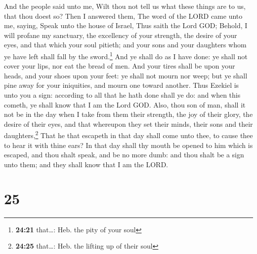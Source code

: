  And the people said unto me, Wilt thou not tell us what
these things are to us, that thou doest so?  Then I
answered them, The word of the LORD came unto me, saying,
 Speak unto the house of Israel, Thus saith the Lord GOD;
Behold, I will profane my sanctuary, the excellency of your strength,
the desire of your eyes, and that which your soul pitieth; and your sons
and your daughters whom ye have left shall fall by the sword.\footnote{\textbf{24:21}
  that\ldots: Heb. the pity of your soul}  And ye shall
do as I have done: ye shall not cover your lips, nor eat the bread of
men.  And your tires shall be upon your heads, and your
shoes upon your feet: ye shall not mourn nor weep; but ye shall pine
away for your iniquities, and mourn one toward another. 
Thus Ezekiel is unto you a sign: according to all that he hath done
shall ye do: and when this cometh, ye shall know that I am the Lord GOD.
 Also, thou son of man, shall it not be in the day when I
take from them their strength, the joy of their glory, the desire of
their eyes, and that whereupon they set their minds, their sons and
their daughters,\footnote{\textbf{24:25} that\ldots: Heb. the lifting up
  of their soul}  That he that escapeth in that day shall
come unto thee, to cause thee to hear it with thine ears?
 In that day shall thy mouth be opened to him which is
escaped, and thou shalt speak, and be no more dumb: and thou shalt be a
sign unto them; and they shall know that I am the LORD.

\hypertarget{section-24}{%
\section{25}\label{section-24}}

